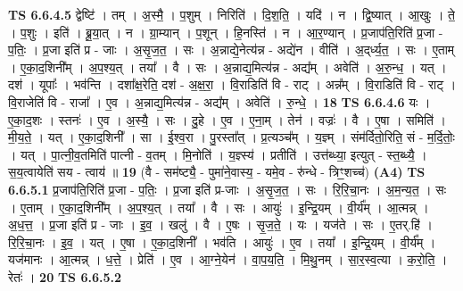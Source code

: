 \documentclass[17pt]{extarticle}
\begin{document}
                  \newline
                                \textbf{ TS 6.6.4.5} \newline
                  द्वेष्टि॑ । तम् । अ॒स्मै॒ । प॒शुम् । निरिति॑ । दि॒श॒ति॒ । यदि॑ । न । द्वि॒ष्यात् । आ॒खुः । ते॒ । प॒शुः । इति॑ । ब्रू॒या॒त् । न । ग्रा॒म्यान् । प॒शून् । हि॒नस्ति॑ । न । आ॒र॒ण्यान् । प्र॒जाप॑ति॒रिति॑ प्र॒जा - प॒तिः॒ । प्र॒जा इति॑ प्र - जाः । अ॒सृ॒ज॒त॒ । सः । अ॒न्नाद्ये॒नेत्य॑न्न - अद्ये॑न । वीति॑ । अ॒द्‌र्ध्य॒त॒ । सः । ए॒ताम् । ए॒का॒द॒शिनी᳚म् । अ॒प॒श्य॒त् । तया᳚ । वै । सः । अ॒न्नाद्य॒मित्य॑न्न - अद्य᳚म् । अवेति॑ । अ॒रु॒न्ध॒ । यत् । दश॑ । यूपाः᳚ । भव॑न्ति । दशा᳚क्ष॒रेति॒ दश॑ - अ॒क्ष॒रा॒ । वि॒राडिति॑ वि - राट् । अन्न᳚म् । वि॒राडिति॑ वि - राट् । वि॒राजेति॑ वि - राजा᳚ । ए॒व । अ॒न्नाद्य॒मित्य॑न्न - अद्य᳚म् । अवेति॑ । रु॒न्धे॒ । \textbf{  18} \newline
                  \newline
                                \textbf{ TS 6.6.4.6} \newline
                  यः । ए॒का॒द॒शः । स्तनः॑ । ए॒व । अ॒स्यै॒ । सः । दु॒हे । ए॒व । ए॒ना॒म् । तेन॑ । वज्रः॑ । वै । ए॒षा । समिति॑ । मी॒य॒ते॒ । यत् । ए॒का॒द॒शिनी᳚ । सा । ई॒श्व॒रा । पु॒रस्ता᳚त् । प्र॒त्यञ्च᳚म् । य॒ज्ञ्म् । संम॑र्दितो॒रिति॒ सं - म॒र्दि॒तोः॒ । यत् । पा॒त्नी॒व॒तमिति॑ पात्नी - व॒तम् । मि॒नोति॑ । य॒ज्ञ्स्य॑ । प्रतीति॑ । उत्त॑ब्ध्या॒ इत्युत् - स्त॒ब्ध्यै॒ । स॒य॒त्वायेति॑ सय - त्वाय॑ ॥ \textbf{  19 } \newline
                  \newline
                      (वै - सम॑ष्ट्यै॒ - पुमा॑ने॒वास्य॒ - यमे॒व - रु॑न्धे - त्रिꣳ॒॒शच्च॑)  \textbf{(A4)} \newline \newline
                                \textbf{ TS 6.6.5.1} \newline
                  प्र॒जाप॑ति॒रिति॑ प्र॒जा - प॒तिः॒ । प्र॒जा इति॑ प्र-जाः । अ॒सृ॒ज॒त॒ । सः । रि॒रि॒चा॒नः । अ॒म॒न्य॒त॒ । सः । ए॒ताम् । ए॒का॒द॒शिनी᳚म् । अ॒प॒श्य॒त् । तया᳚ । वै । सः । आयुः॑ । इ॒न्द्रि॒यम् । वी॒र्य᳚म् । आ॒त्मन्न् । अ॒ध॒त्त॒ । प्र॒जा इति॑ प्र - जाः । इ॒व॒ । खलु॑ । वै । ए॒षः । सृ॒ज॒ते॒ । यः । यज॑ते । सः । ए॒तर्.हि॑ । रि॒रि॒चा॒नः । इ॒व॒ । यत् । ए॒षा । ए॒का॒द॒शिनी᳚ । भव॑ति । आयुः॑ । ए॒व । तया᳚ । इ॒न्द्रि॒यम् । वी॒र्य᳚म् । यज॑मानः । आ॒त्मन्न् । ध॒त्ते॒ । प्रेति॑ । ए॒व । आ॒ग्ने॒येन॑ । वा॒प॒य॒ति॒ । मि॒थु॒नम् । सा॒र॒स्व॒त्या । क॒रो॒ति॒ । रेतः॑ । \textbf{  20} \newline
                  \newline
                                \textbf{ TS 6.6.5.2} \newline
\end{document}
